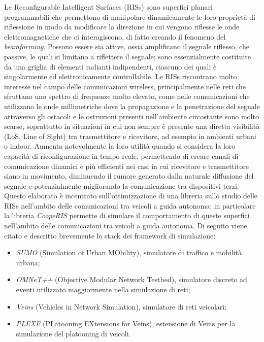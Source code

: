 Le Reconfigurable Intelligent Surfaces (RISs) sono superfici planari programmabili
che permettono di manipolare dinamicamente le loro proprietà di riflessione in modo
da modificare la direzione in cui vengono riflesse le onde elettromagnetiche che
ci interagiscono, di fatto creando il fenomeno del \textit{beamforming}. Possono
essere sia attive, ossia amplificano il segnale riflesso, che passive, le quali si
limitano a riflettere il segnale; sono essenzialmente costituite da una griglia
di elementi radianti indipendenti, ciascuno dei quali è singolarmente ed elettronicamente
controllabile. Le RISs riscontrano molto interesse nel campo delle comunicazioni
wireless, principalmente nelle reti che sfruttano uno spettro di frequenze molto
elevato, come nelle comunicazioni che utilizzano le onde millimetriche dove la
propagazione e la penetrazione del segnale attraverso gli ostacoli e le
ostruzioni presenti nell'ambiente circostante sono molto scarse, soprattutto in situazioni
in cui non sempre è presente una diretta visibilità (LoS, Line of Sight) tra
trasmettitore e ricevitore, ad esempio in ambienti urbani o indoor. Aumenta
notevolmente la loro utilità quando si considera la loro capacità di
riconfigurazione in tempo reale, permettendo di creare canali di comunicazione dinamici
e più efficienti nei casi in cui ricevitore e trasmettitore siano in movimento,
diminuendo il rumore generato dalla naturale diffusione del segnale e
potenzialmente migliorando la comunicazione tra dispositivi terzi. Questo elaborato
è incentrato sull'ottimizzazione di una libreria sullo studio delle RISs nell'ambito
delle comunicazioni tra veicoli a guida autonoma: in particolare la libreria
\textit{CoopeRIS}\cite{cooperis} permette di simulare il comportamento di queste
superfici nell'ambito delle comunicazioni tra veicoli a guida autonoma. Di seguito
viene citato e descritto brevemente lo stack dei framework di simulazione:
\begin{itemize}
  \item \textit{SUMO} (Simulation of Urban MObility), simulatore di traffico e mobilità
    urbana\cite{sumo};

  \item \textit{OMNeT++} (Objective Modular Network Testbed), simulatore discreto
    ad eventi utilizzato maggiormente nella simulazione di reti\cite{omnetpp};

  \item \textit{Veins} (Vehicles in Network Simulation), simulatore di reti veicolari\cite{veins};

  \item \textit{PLEXE} (PLatooning EXtensions for Veins), estensione di Veins per
    la simulazione del platooning di veicoli\cite{plexe}.
\end{itemize}

